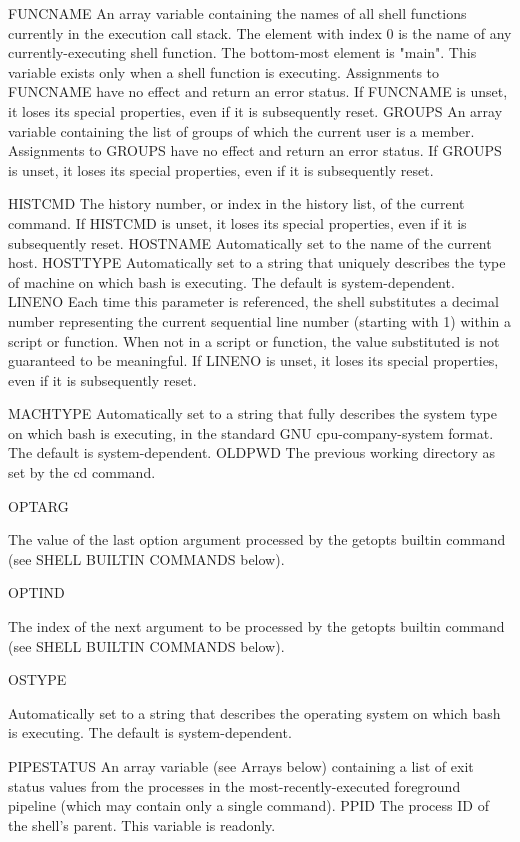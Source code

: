 \documentclass[11pt]{article}
\begin{document}
FUNCNAME
An array variable containing the names of all shell functions currently in the execution call stack. The element with index 0 is the name of any currently-executing shell function. The bottom-most element is "main". This variable exists only when a shell function is executing. Assignments to FUNCNAME have no effect and return an error status. If FUNCNAME is unset, it loses its special properties, even if it is subsequently reset.
GROUPS
An array variable containing the list of groups of which the current user is a member. Assignments to GROUPS have no effect and return an error status. If GROUPS is unset, it loses its special properties, even if it is subsequently reset.

HISTCMD
The history number, or index in the history list, of the current command. If HISTCMD is unset, it loses its special properties, even if it is subsequently reset.
HOSTNAME
Automatically set to the name of the current host.
HOSTTYPE
Automatically set to a string that uniquely describes the type of machine on which bash is executing. The default is system-dependent.
LINENO
Each time this parameter is referenced, the shell substitutes a decimal number representing the current sequential line number (starting with 1) within a script or function. When not in a script or function, the value substituted is not guaranteed to be meaningful. If LINENO is unset, it loses its special properties, even if it is subsequently reset.

MACHTYPE
Automatically set to a string that fully describes the system type on which bash is executing, in the standard GNU cpu-company-system format. The default is system-dependent.
OLDPWD
The previous working directory as set by the cd command.

OPTARG

The value of the last option argument processed by the getopts builtin command (see SHELL BUILTIN COMMANDS below).

OPTIND

The index of the next argument to be processed by the getopts builtin command (see SHELL BUILTIN COMMANDS below).

OSTYPE

Automatically set to a string that describes the operating system on which bash is executing. The default is system-dependent.

PIPESTATUS
An array variable (see Arrays below) containing a list of exit status values from the processes in the most-recently-executed foreground pipeline (which may contain only a single command).
PPID
The process ID of the shell's parent. This variable is readonly.
\end{document}
